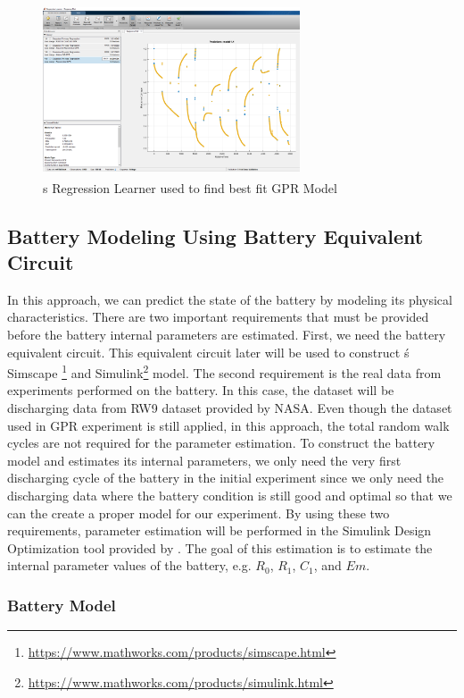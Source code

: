 \begin{figure}
 \includegraphics[height=2in, width=3in]{figures/GPR/regresion_learner}
\caption{\MATLAB\textquotesingle s Regression Learner used to find best fit GPR Model}
\label{fig:regresion_learner}
\end{figure}


\subsection{Battery Modeling Using Battery Equivalent Circuit}

In this approach, we can predict the state of the battery by modeling its physical characteristics. There are two important requirements that must be provided before the battery internal parameters are estimated. First, we need the battery equivalent circuit. This equivalent circuit later will be used to construct \MATLAB\'s Simscape \footnote{\url{https://www.mathworks.com/products/simscape.html}} and Simulink\footnote{\url{https://www.mathworks.com/products/simulink.html}} model. The second requirement is the real data from experiments performed on the battery. In this case, the dataset will be discharging data from RW9 dataset provided by NASA. Even though the dataset used in GPR experiment is still applied, in this approach, the total random walk cycles are not required for the parameter estimation. To construct the battery model and estimates its internal parameters, we only need the very first discharging cycle of the battery in the initial experiment since we only need the discharging data where the battery condition is still good and optimal so that we can the create a proper model for our experiment. By using these two requirements, parameter estimation will be performed in the Simulink Design Optimization tool provided by \MATLAB. The goal of this estimation is to estimate the internal parameter values of the battery, e.g. $R_0$, $R_1$, $C_1$, and $Em$.

\subsubsection{Battery Model}

